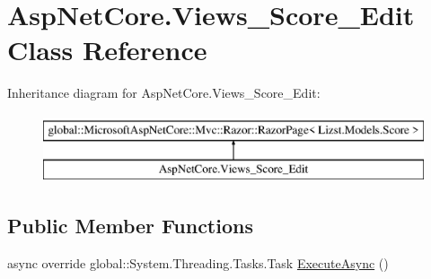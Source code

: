 \hypertarget{class_asp_net_core_1_1_views___score___edit}{}\section{Asp\+Net\+Core.\+Views\+\_\+\+Score\+\_\+\+Edit Class Reference}
\label{class_asp_net_core_1_1_views___score___edit}
Inheritance diagram for Asp\+Net\+Core.\+Views\+\_\+\+Score\+\_\+\+Edit\+:\begin{figure}[H]
\begin{center}
\leavevmode
\includegraphics[height=2.000000cm]{class_asp_net_core_1_1_views___score___edit}
\end{center}
\end{figure}
\subsection*{Public Member Functions}
\begin{DoxyCompactItemize}
\item 
async override global\+::\+System.\+Threading.\+Tasks.\+Task \mbox{\hyperlink{class_asp_net_core_1_1_views___score___edit_ac150553fd0e6d87dcd9ed80eb539ab2a}{Execute\+Async}} ()
\end{DoxyCompactItemize}

